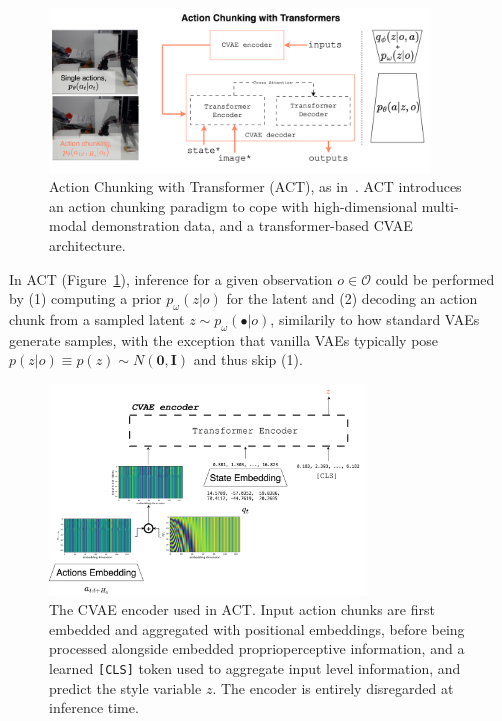 \begin{figure}
    \centering
    \includegraphics[width=0.9\textwidth]{figures/ch4/ch4-act.png}
    \caption{Action Chunking with Transformer (ACT), as in~\citet{zhaoLearningFineGrainedBimanual2023}. ACT introduces an action chunking paradigm to cope with high-dimensional multi-modal demonstration data, and a transformer-based CVAE architecture.}
    \label{fig:ch4-act}
\end{figure}

In ACT (Figure~\ref{fig:ch4-act}), inference for a given observation \( o \in \mathcal O \) could be performed by (1) computing a prior \( p_\omega(z \vert o) \) for the latent and (2) decoding an action chunk from a sampled latent \( z \sim p_\omega(\bullet \vert o) \), similarily to how standard VAEs generate samples, with the exception that vanilla VAEs typically pose \( p(z\vert o) \equiv p(z) \sim N(\mathbf{0}, \mathbf{I}) \) and thus skip (1).

\begin{figure}
    \centering
    \includegraphics[width=0.75\textwidth]{figures/ch4/ch4-act-encoder.png}
    \caption{The CVAE encoder used in ACT. Input action chunks are first embedded and aggregated with positional embeddings, before being processed alongside embedded proprioperceptive information, and a learned \texttt{[CLS]} token used to aggregate input level information, and predict the style variable \( z \). The encoder is entirely disregarded at inference time.}
    \label{fig:ch4-act-encoder}
\end{figure}

